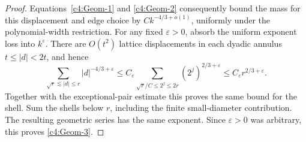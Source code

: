 \begin{proof}
Equations~\eqref{c4:Geom-1} and \eqref{c4:Geom-2} consequently bound the
mass for this displacement and edge choice by
\(Ck^{-4/3+o(1)}\), uniformly under the polynomial-width restriction.
For any fixed \(\varepsilon>0\), absorb the uniform exponent loss into
\(k^{\varepsilon}\).  There are \(O(t^2)\) lattice displacements in each
dyadic annulus \(t\le |d|<2t\), and hence
\[
 \sum_{\sqrt r\lesssim |d|\le r}|d|^{-4/3+\varepsilon}
   \le C_\varepsilon
      \sum_{\sqrt r/ C\le 2^j\le 2r}
            (2^j)^{2/3+\varepsilon}
   \le C_\varepsilon r^{2/3+\varepsilon}.
\]
Together with the exceptional-pair estimate this proves the same bound
for the shell.  Sum the shells below \(r\), including the finite
small-diameter contribution.  The resulting geometric series has the
same exponent.  Since \(\varepsilon>0\) was arbitrary, this proves
\eqref{c4:Geom-3}.
\end{proof}
